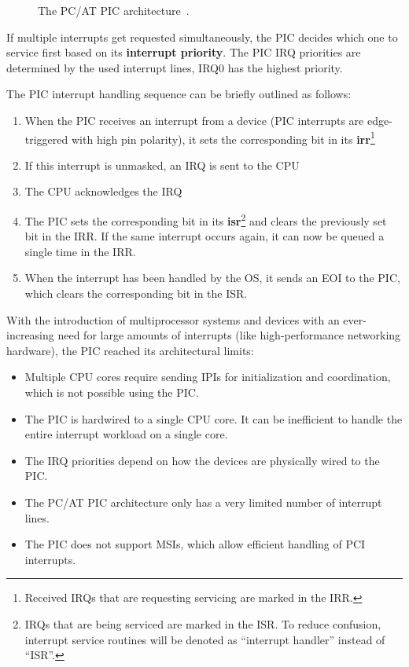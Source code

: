 \begin{figure}[h]
  \centering
  \begin{subfigure}[b]{0.3\textwidth}
    
  \end{subfigure}
  \caption{The PC/AT PIC architecture~\cite[sec.~1.13]{pcat}.}
  \label{fig:pcatpic}
\end{figure}

If multiple interrupts get requested simultaneously, the PIC decides which one to service first
based on its \textbf{\gls{interrupt priority}}. The PIC IRQ priorities are determined by the used
interrupt lines, IRQ0 has the highest priority.

The PIC interrupt handling sequence can be briefly outlined as follows:

\begin{enumerate}
  \item When the PIC receives an interrupt from a device (PIC interrupts are edge-triggered with high pin
        polarity), it sets the corresponding bit in its \textbf{\gls{irr}}\footnote{Received IRQs that are
          requesting servicing are marked in the IRR.}
  \item If this interrupt is unmasked, an IRQ is sent to the CPU
  \item The CPU acknowledges the IRQ
  \item The PIC sets the corresponding bit in its \textbf{\gls{isr}}\footnote{IRQs that are being serviced
          are marked in the ISR. To reduce confusion, interrupt service routines will be denoted as
          ``interrupt handler'' instead of ``ISR''.} and clears the previously set bit in the IRR. If the
        same interrupt occurs again, it can now be queued a single time in the IRR\@.
  \item When the interrupt has been handled by the OS, it sends an EOI to the PIC, which clears the
        corresponding bit in the ISR\@.
\end{enumerate}

With the introduction of multiprocessor systems and devices with an ever-increasing need for large
amounts of interrupts (like high-performance networking hardware), the PIC reached its
architectural limits:

\begin{itemize}
  \item Multiple CPU cores require sending IPIs for initialization and coordination, which is not possible
        using the PIC\@.
  \item The PIC is hardwired to a single CPU core. It can be inefficient to handle the entire interrupt
        workload on a single core.
  \item The IRQ priorities depend on how the devices are physically wired to the PIC\@.
  \item The PC/AT PIC architecture only has a very limited number of interrupt lines.
  \item The PIC does not support MSIs, which allow efficient handling of PCI interrupts.
\end{itemize}

